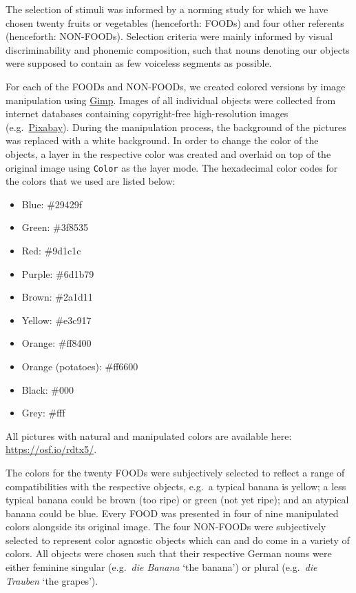 \documentclass[
]{article}
\providecommand{\tightlist}{%
  \setlength{\itemsep}{0pt}\setlength{\parskip}{0pt}}
\begin{document}
The selection of stimuli was informed by a norming study for which we have chosen twenty fruits or vegetables (henceforth: FOODs) and four other referents (henceforth: NON-FOODs).
Selection criteria were mainly informed by visual discriminability and phonemic composition, such that nouns denoting our objects were supposed to contain as few voiceless segments as possible.

For each of the FOODs and NON-FOODs, we created colored versions by image manipulation using \href{http://www.gimp.org}{Gimp}.
Images of all individual objects were collected from internet databases containing copyright-free high-resolution images (e.g.~\href{https://pixabay.com}{Pixabay}).
During the manipulation process, the background of the pictures was replaced with a white background.
In order to change the color of the objects, a layer in the respective color was created and overlaid on top of the original image using \texttt{Color} as the layer mode.
The hexadecimal color codes for the colors that we used are listed below:

\begin{itemize}
\tightlist
\item
  Blue: \#29429f
\item
  Green: \#3f8535
\item
  Red: \#9d1c1c
\item
  Purple: \#6d1b79
\item
  Brown: \#2a1d11
\item
  Yellow: \#e3c917
\item
  Orange: \#ff8400
\item
  Orange (potatoes): \#ff6600
\item
  Black: \#000
\item
  Grey: \#fff
\end{itemize}

All pictures with natural and manipulated colors are available here: \url{https://osf.io/rdtx5/}.

The colors for the twenty FOODs were subjectively selected to reflect a range of compatibilities with the respective objects, e.g.~a typical banana is yellow; a less typical banana could be brown (too ripe) or green (not yet ripe); and an atypical banana could be blue.
Every FOOD was presented in four of nine manipulated colors alongside its original image.
The four NON-FOODs were subjectively selected to represent color agnostic objects which can and do come in a variety of colors.
All objects were chosen such that their respective German nouns were either feminine singular (e.g.~\emph{die Banana} `the banana') or plural (e.g.~\emph{die Trauben} `the grapes').
\end{document}
